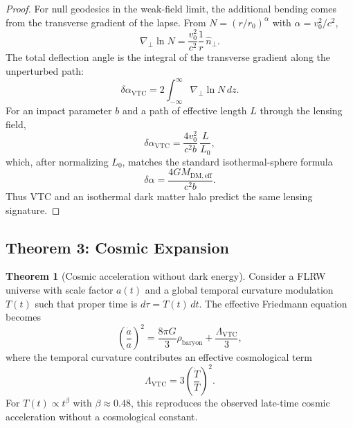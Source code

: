 \documentclass[11pt,a4paper]{article}
\theoremstyle{definition}
\newtheorem{theorem}{Theorem}[section]
\newcommand{\eff}{\mathrm{eff}}
\newcommand{\DM}{\mathrm{DM}}
\newcommand{\VTC}{\mathrm{VTC}}
\begin{document}
\begin{proof}
For null geodesics in the weak-field limit, the additional bending comes from the transverse gradient of the lapse. From $N=(r/r_0)^\alpha$ with $\alpha=v_0^2/c^2$,
\begin{equation}
    \nabla_\perp\ln N = \frac{v_0^2}{c^2}\frac{1}{r}\,\hat{n}_\perp.
\end{equation}
The total deflection angle is the integral of the transverse gradient along the unperturbed path:
\begin{equation}
    \delta\alpha_{\VTC} = 2\int_{-\infty}^{\infty} \nabla_\perp\ln N\,dz.
\end{equation}
For an impact parameter $b$ and a path of effective length $L$ through the lensing field,
\begin{equation}
    \delta\alpha_{\VTC} = \frac{4v_0^2}{c^2 b}\,\frac{L}{L_0},
\end{equation}
which, after normalizing $L_0$, matches the standard isothermal-sphere formula
\begin{equation}
    \boxed{\delta\alpha = \frac{4GM_{\DM,\eff}}{c^2 b}}.
\end{equation}
Thus VTC and an isothermal dark matter halo predict the same lensing signature.
\end{proof}

\subsection{Theorem 3: Cosmic Expansion}

\begin{theorem}[Cosmic acceleration without dark energy]
\label{thm:cosmic}
Consider a FLRW universe with scale factor $a(t)$ and a global temporal curvature modulation $T(t)$ such that proper time is $d\tau = T(t)\,dt$. The effective Friedmann equation becomes
\begin{equation}
    \left(\frac{\dot{a}}{a}\right)^2 = \frac{8\pi G}{3}\rho_{\mathrm{baryon}} + \frac{\Lambda_{\VTC}}{3},
\end{equation}
where the temporal curvature contributes an effective cosmological term
\begin{equation}
    \Lambda_{\VTC} = 3\left(\frac{\dot{T}}{T}\right)^2.
\end{equation}
For $T(t)\propto t^{\beta}$ with $\beta\approx 0.48$, this reproduces the observed late-time cosmic acceleration without a cosmological constant.
\end{theorem}
\end{document}
